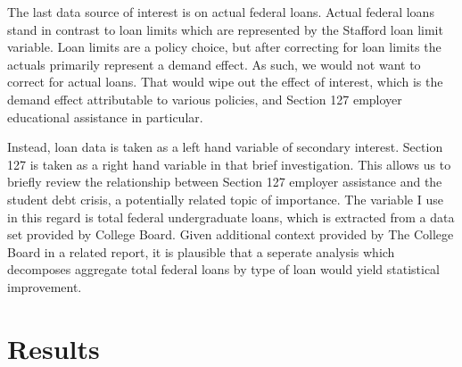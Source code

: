 \documentclass[review]{elsarticle}
\begin{document}
% 
% 

The last data source of interest is on actual federal loans.
Actual federal loans stand in contrast to loan limits which are represented by the Stafford loan limit variable.
Loan limits are a policy choice, but after correcting for loan limits the actuals primarily represent a demand effect.
As such, we would not want to correct for actual loans.
That would wipe out the effect of interest,
which is the demand effect attributable to various policies,
and Section 127 employer educational assistance in particular.

Instead, loan data is taken as a left hand variable of secondary interest.
Section 127 is taken as a right hand variable in that brief investigation.
This allows us to briefly review the relationship between Section 127 employer assistance
and the student debt crisis, a potentially related topic of importance.
The variable I use in this regard is total federal undergraduate loans,
which is extracted from a data set provided by College Board\cite{cb_excel_2019}.
Given additional context provided by The College Board in a related report\cite{cb_trends_2019},
it is plausible that a seperate analysis which decomposes aggregate total federal loans by type of loan would yield statistical improvement.

\section{Results}
\end{document}
